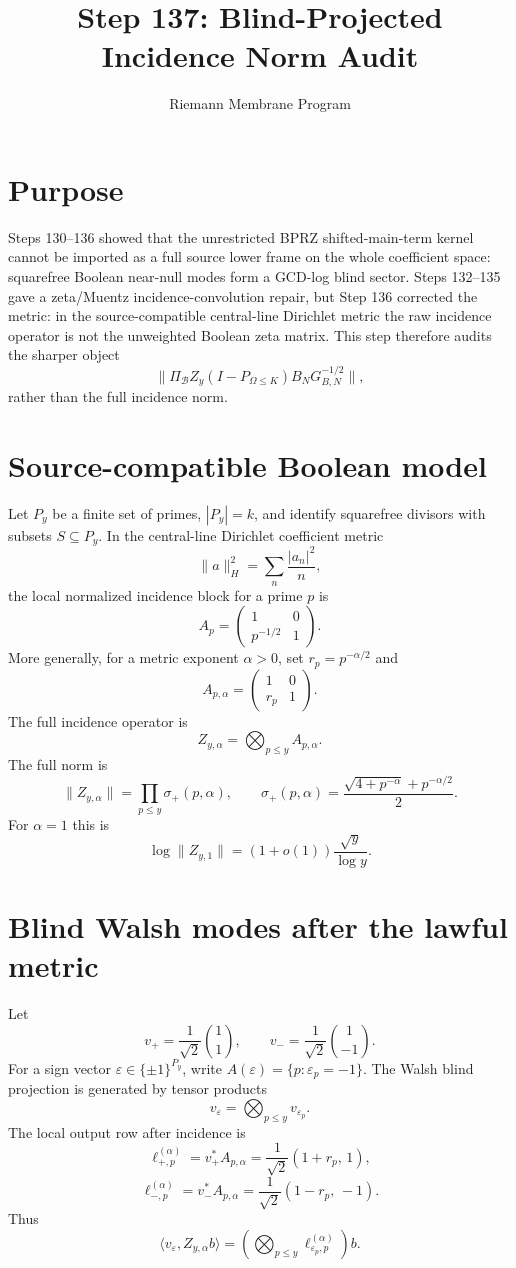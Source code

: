 \documentclass[11pt]{article}
\title{Step 137: Blind-Projected Incidence Norm Audit}
\author{Riemann Membrane Program}
\date{}
\newcommand{\B}{\mathcal B}
\begin{document}
\maketitle

\section{Purpose}
Steps 130--136 showed that the unrestricted BPRZ shifted-main-term kernel cannot be imported as a full source lower frame on the whole coefficient space: squarefree Boolean near-null modes form a GCD-log blind sector. Steps 132--135 gave a zeta/Muentz incidence-convolution repair, but Step 136 corrected the metric: in the source-compatible central-line Dirichlet metric the raw incidence operator is not the unweighted Boolean zeta matrix. This step therefore audits the sharper object
\[
  \bigl\|\Pi_{\B} Z_y (I-P_{\Omega\le K}) B_NG_{B,N}^{-1/2}\bigr\|,
\]
rather than the full incidence norm.

\section{Source-compatible Boolean model}
Let $P_y$ be a finite set of primes, $|P_y|=k$, and identify squarefree divisors with subsets $S\subseteq P_y$. In the central-line Dirichlet coefficient metric
\[
  \|a\|_H^2=\sum_n \frac{|a_n|^2}{n},
\]
the local normalized incidence block for a prime $p$ is
\[
  A_p=
  \begin{pmatrix}
  1&0\\ p^{-1/2}&1
  \end{pmatrix}.
\]
More generally, for a metric exponent $\alpha>0$, set $r_p=p^{-\alpha/2}$ and
\[
  A_{p,\alpha}=\begin{pmatrix}1&0\\ r_p&1\end{pmatrix}.
\]
The full incidence operator is
\[
  Z_{y,\alpha}=\bigotimes_{p\le y}A_{p,\alpha}.
\]
The full norm is
\[
  \|Z_{y,\alpha}\|=
  \prod_{p\le y}\sigma_+(p,\alpha),
  \qquad
  \sigma_+(p,\alpha)=\frac{\sqrt{4+p^{-\alpha}}+p^{-\alpha/2}}2.
\]
For $\alpha=1$ this is
\[
  \log\|Z_{y,1}\|=(1+o(1))\frac{\sqrt y}{\log y}.
\]

\section{Blind Walsh modes after the lawful metric}
Let
\[
  v_+=\frac1{\sqrt2}\binom{1}{1},
  \qquad
  v_- =\frac1{\sqrt2}\binom{1}{-1}.
\]
For a sign vector $\varepsilon\in\{\pm1\}^{P_y}$, write $A(\varepsilon)=\{p:\varepsilon_p=-1\}$. The Walsh blind projection is generated by tensor products
\[
  v_{\varepsilon}=\bigotimes_{p\le y}v_{\varepsilon_p}.
\]
The local output row after incidence is
\[
  \ell_{+,p}^{(\alpha)}=v_+^*A_{p,\alpha}
  =\frac1{\sqrt2}(1+r_p,\,1),
\]
\[
  \ell_{-,p}^{(\alpha)}=v_-^*A_{p,\alpha}
  =\frac1{\sqrt2}(1-r_p,\,-1).
\]
Thus
\[
  \langle v_\varepsilon,Z_{y,\alpha}b\rangle
  =\left(\bigotimes_{p\le y}\ell_{\varepsilon_p,p}^{(\alpha)}\right)b.
\]
\end{document}
